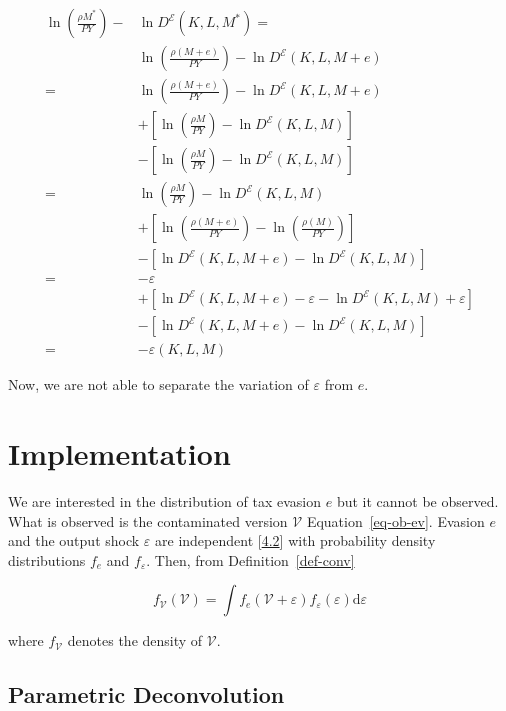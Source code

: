\documentclass[
  12pt]{article}
\theoremstyle{definition}
\theoremstyle{remark}
\begin{document}
\[
\begin{aligned}
    \ln\left(\frac{\rho M^*}{PY}\right)-&\ln D^{\mathcal{E}}(K,L,M^*)=\\
    &\ln\left(\frac{\rho(M+e)}{PY}\right)-\ln D^{\mathcal{E}}(K,L,M+e)\\
    =&\ln\left(\frac{\rho(M+e)}{PY}\right)-\ln D^{\mathcal{E}}(K,L,M+e)\\
    &+\left[\ln\left(\frac{\rho M}{PY}\right)-\ln D^{\mathcal{E}}(K,L,M)\right]\\
    &-\left[\ln\left(\frac{\rho M}{PY}\right)-\ln D^{\mathcal{E}}(K,L,M)\right] \\
    =&\ln\left(\frac{\rho M}{PY}\right)-\ln D^{\mathcal{E}}(K,L,M) \\
    &+\left[\ln\left(\frac{\rho(M+e)}{PY}\right)-\ln\left(\frac{\rho(M)}{PY}\right)\right]\\
    &-\left[\ln D^{\mathcal{E}}(K,L,M+e)-\ln D^{\mathcal{E}}(K,L,M)\right]\\
    =& -\varepsilon \\
    &+\left[\ln D^{\mathcal{E}}(K,L,M+e)-\varepsilon-\ln D^{\mathcal{E}}(K,L,M)+\varepsilon\right]\\
    &-\left[\ln D^{\mathcal{E}}(K,L,M+e)-\ln D^{\mathcal{E}}(K,L,M)\right]\\
    =& -\varepsilon(K,L,M)
\end{aligned}
\]

Now, we are not able to separate the variation of \(\varepsilon\) from
\(e\).

\section{Implementation}\label{implementation}

We are interested in the distribution of tax evasion \(e\) but it cannot
be observed. What is observed is the contaminated version
\(\mathcal{V}\) Equation~\ref{eq-ob-ev}. Evasion \(e\) and the output
shock \(\varepsilon\) are independent {[}\hyperref[ass-ind]{4.2}{]} with
probability density distributions \(f_e\) and \(f_{\varepsilon}\). Then,
from Definition~\ref{def-conv}

\[
f_{\mathcal{V}}(\mathcal{V})=\int f_e(\mathcal{V}+\varepsilon)f_{\varepsilon}(\varepsilon)\text{d}\varepsilon
\]

where \(f_{\mathcal{V}}\) denotes the density of \(\mathcal{V}\).

\subsection{Parametric Deconvolution}\label{parametric-deconvolution}
\end{document}
